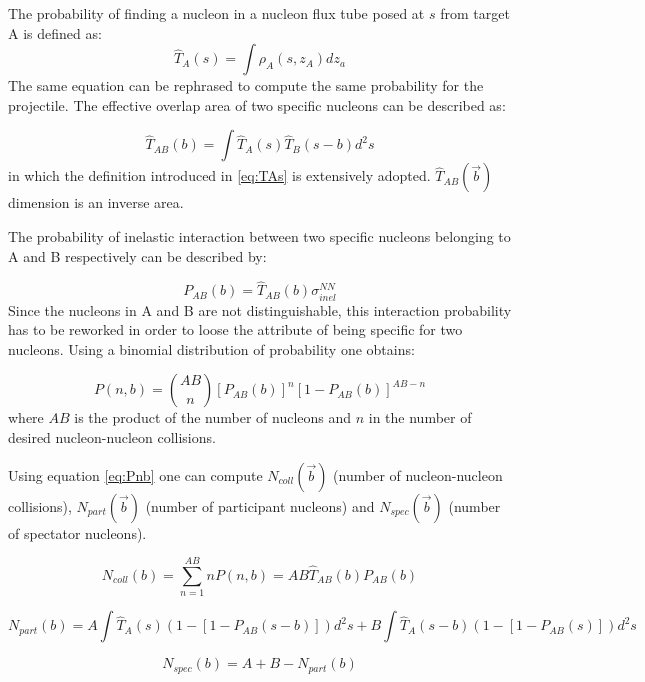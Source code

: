 The probability of finding a nucleon in a nucleon flux tube posed at $s$ from target A is defined as:\
\begin{equation}
\label{eq:TAs}
\hat{T}_A(s) = \int{\rho}_A(s,z_A)dz_a
\end{equation}
The same equation can be rephrased to compute the same probability for the projectile.
The effective overlap area of two specific nucleons can be described as:

\begin{equation}
\label{eq:TAB}
\hat{T}_{AB}(b) = \int\hat{T}_A(s)\hat{T}_B(s-b)d^2s
\end{equation}
in which the definition introduced in \ref{eq:TAs} is extensively adopted.
$\hat{T}_{AB}(\vec{b})$ dimension is an inverse area.

The probability of inelastic interaction between two specific nucleons belonging to A and B respectively can be described by:

\begin{equation}
\label{eq:PAB}
P_{AB}(b)=\hat{T}_{AB}(b)\sigma_{inel}^{NN}
\end{equation}
Since the nucleons in A and B are not distinguishable, this interaction probability has to be reworked in order to loose the attribute of being specific for two nucleons.
Using a binomial distribution of probability one obtains:

\begin{equation}
\label{eq:Pnb}
P(n,b)=\binom{AB}{n}[P_{AB}(b)]^n[1-P_{AB}(b)]^{AB-n}
\end{equation}
where $AB$ is the product of the number of nucleons and $n$ in the number of desired nucleon-nucleon collisions.

Using equation \ref{eq:Pnb} one can compute $N_{coll}(\vec{b})$ (number of nucleon-nucleon collisions), $N_{part}(\vec{b})$ (number of participant nucleons) and $N_{spec}(\vec{b})$ (number of spectator nucleons).

\begin{equation}
\label{eq:Ncoll}
N_{coll}(b)=\sum_{n=1}^{AB}nP(n,b)=AB\hat{T}_{AB}(b)P_{AB}(b)
\end{equation}

\begin{equation}
\label{eq:Npart}
N_{part}(b)=A\int\hat{T}_A(s)(1-[1-P_{AB}(s-b)])d^2s + B\int\hat{T}_A(s-b)(1-[1-P_{AB}(s)])d^2s
\end{equation}

\begin{equation}
\label{eq:Nspec}
N_{spec}(b)=A+B-N_{part}(b)
\end{equation}

